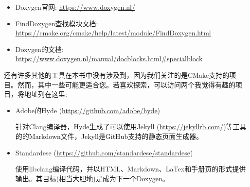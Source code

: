 

\begin{itemize}
\item 
Doxygen官网: \url{https://www.doxygen.nl/}

\item 
FindDoxygen查找模块文档: \url{https://cmake.org/cmake/help/latest/module/FindDoxygen.html}

\item 
Doxygen的文档: \url{https://www.doxygen.nl/manual/docblocks.html\#specialblock}
\end{itemize}



还有许多其他的工具在本书中没有涉及到，因为我们关注的是CMake支持的项目。然而，其中一些可能更适合您。若喜欢探索，可以访问两个我觉得有趣的项目，将地址列在这里:

\begin{itemize}
\item 
Adobe的Hyde (\url{https://github.com/adobe/hyde})

针对Clang编译器，Hyde生成了可以使用Jekyll (\url{https://jekyllrb.com/})等工具的的Markdown文件，Jekyll是GitHub支持的静态页面生成器。

\item 
Standardese (\url{https://github.com/standardese/standardese})

使用libclang编译代码，并以HTML、Markdown、LaTex和手册页的形式提供输出。其目标(相当大胆地)是成为下一个Doxygen。
\end{itemize}



















